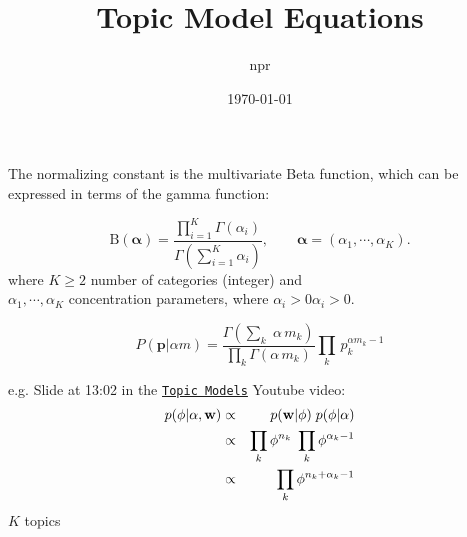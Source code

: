 \documentclass[11pt,a4paper]{article}
\begin{document}
   \title{Topic Model Equations}
  \author{npr}
 \date{\today}
\maketitle


The normalizing constant is the multivariate Beta function, which can be expressed in terms of the gamma function:

\begin{equation}
\mathrm {B} ({\boldsymbol {\alpha }})={\frac {\prod _{i=1}^{K}\Gamma (\alpha _{i})}{\Gamma \left(\sum _{i=1}^{K}\alpha _{i}\right)}},\qquad {\boldsymbol {\alpha }}=(\alpha _{1},\cdots ,\alpha _{K}).
\end{equation}
where $K\geq 2$ number of categories (integer) and \\
$\alpha_{1},\cdots ,\alpha_{K}$ concentration parameters, where $\alpha_{i}>0 \alpha_{i}>0$.

\begin{equation}
P(\mathbf{p}| \alpha m) =  \frac{\Gamma(\sum_{k}\; \alpha \, m_k) }{\prod_{k}\Gamma(\alpha \, m_k)}\prod_{k} \, p_{k}^{\alpha m_k -1}
\end{equation}

\smallskip
\smallskip
\noindent
e.g. Slide at 13:02 in the \href{https://www.youtube.com/watch?v=yK7nN3FcgUs&t=715s}{\tt Topic Models} Youtube video:
\begin{eqnarray}
p(\phi | \alpha, {\bf w})  & \propto & p({\bf w} | \phi) \;  p(\phi|\alpha) \\
                                       & \propto & \prod_{k} \phi^{n_{k}}  \; \prod_{k} \phi^{\alpha_{k}-1}\\ 
                                       & \propto & \prod_{k} \phi^{n_{k} + \alpha_{k}-1}
\end{eqnarray}
$K$ topics\\
\end{document}
